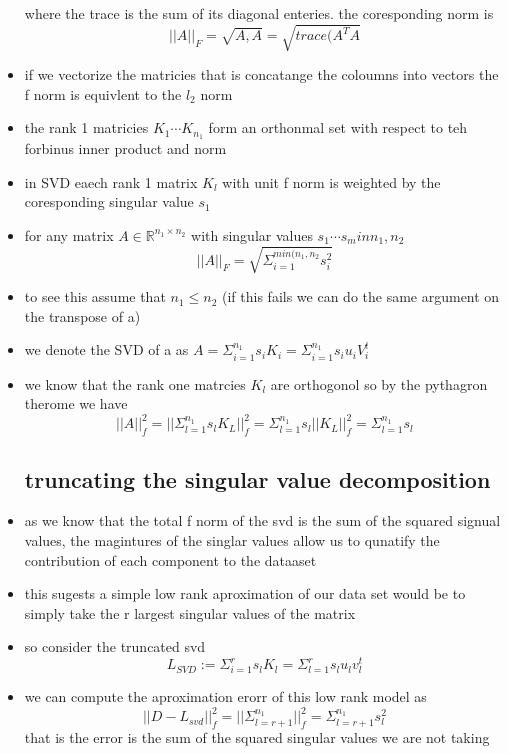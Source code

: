 \documentclass{article}
\begin{document}
\begin{itemize}
where the trace is the sum of its diagonal enteries. the coresponding norm is 
$$||A||_{F}=\sqrt{{A,A}}=\sqrt{trace(A^TA}$$
\item if we vectorize the matricies that is concatange the coloumns into vectors the f norm is equivlent to the $l_{2}$ norm 
\item the rank 1 matricies $K_1\cdots K_n_{1}$ form an orthonmal set with respect to teh forbinus inner product and norm 
\item in SVD eaech rank 1 matrix $K_{l}$ with unit f norm is weighted by the coresponding singular value $s_1$
\item for any matrix $A\in \mathbb{R}^{n_1\times n_2}$ with singular values $s_1\cdots s_min{n_1,n_2}$ $$||A||_{F}=\sqrt{\Sigma_{i=1}^{min(n_1,n_2} s_{i}^2}$$
\item to see this assume that $n_1\leq n_2$ (if this fails we can do the same argument on the transpose of a)
\item we denote the SVD of a as $A=\Sigma_{i=1}^{n_1}s_{i}K_{i}=\Sigma_{i=1}^{n_1}s_{i}u_{i}V_{i}^{t}$
\item we know that the rank one matrcies $K_{l}$ are orthogonol so by the pythagron therome we have $$||A||_{f}^{2}=||\Sigma_{l=1}^{n_1}s_lK_L||_{f}^{2}=\Sigma_{l=1}^{n_1}s_l||K_L||_{f}^{2}=\Sigma_{l=1}^{n_1}s_l$$
\subsection{truncating the singular value decomposition}
\item as we know that the total f norm of the svd is the sum of the squared signual values, the magintures of the singlar values allow us to qunatify the contribution of each component to the dataaset
\item this sugests a simple low rank aproximation of our data set would be to simply take the r largest singular values of the matrix 
\item so consider the truncated svd $$L_{SVD}:=\Sigma_{i=1}^{r}s_{l}K_{l}=\Sigma_{l=1}^{r}s_lu_lv_l^t$$
\item we can compute the aproximation erorr of this low rank model as $$||D-L_{svd}||_{f}^{2}=||\Sigma_{l=r+1}^{n_1}||_{f}^{2}=\Sigma_{l=r+1}^{n_1}s_{l}^2$$ that is the error is the sum of the squared singular values we are not taking 

\end{itemize}
\end{document}
